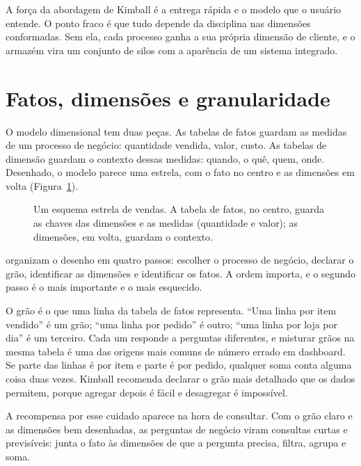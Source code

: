 A força da abordagem de Kimball é a entrega rápida e o modelo que o usuário entende. O
ponto fraco é que tudo depende da disciplina nas dimensões conformadas. Sem ela, cada
processo ganha a sua própria dimensão de cliente, e o armazém vira um conjunto de silos
com a aparência de um sistema integrado.

\section{Fatos, dimensões e granularidade}
\label{sec:modelagem-dimensional}

O modelo dimensional tem duas peças. As tabelas de fatos guardam as medidas de um
processo de negócio: quantidade vendida, valor, custo. As tabelas de dimensão guardam o
contexto dessas medidas: quando, o quê, quem, onde. Desenhado, o modelo parece uma
estrela, com o fato no centro e as dimensões em volta (Figura~\ref{fig:estrela}).

\begin{figure}[htbp]
  \centering
  
  \caption{Um esquema estrela de vendas. A tabela de fatos, no centro, guarda as chaves das dimensões e as medidas (quantidade e valor); as dimensões, em volta, guardam o contexto.}
  \label{fig:estrela}
\end{figure}

\textcite{kimball2013} organizam o desenho em quatro passos: escolher o processo de
negócio, declarar o grão, identificar as dimensões e identificar os fatos. A ordem
importa, e o segundo passo é o mais importante e o mais esquecido.

O grão é o que uma linha da tabela de fatos representa. \enquote{Uma linha por item
vendido} é um grão; \enquote{uma linha por pedido} é outro; \enquote{uma linha por loja
por dia} é um terceiro. Cada um responde a perguntas diferentes, e misturar grãos na
mesma tabela é uma das origens mais comuns de número errado em dashboard. Se parte das
linhas é por item e parte é por pedido, qualquer soma conta alguma coisa duas vezes.
Kimball recomenda declarar o grão mais detalhado que os dados permitem, porque agregar
depois é fácil e desagregar é impossível.


A recompensa por esse cuidado aparece na hora de consultar. Com o grão claro e as
dimensões bem desenhadas, as perguntas de negócio viram consultas curtas e previsíveis:
junta o fato às dimensões de que a pergunta precisa, filtra, agrupa e soma.

